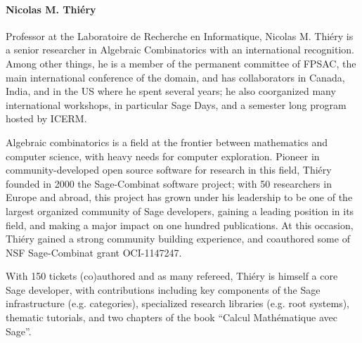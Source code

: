\paragraph{Nicolas M. Thiéry}

Professor at the Laboratoire de Recherche en Informatique, Nicolas
M. Thiéry is a senior researcher in Algebraic Combinatorics with an
international recognition. Among other things, he is a member of the
permanent committee of FPSAC, the main international conference of the
domain, and has collaborators in Canada, India, and in the US where he
spent several years; he also coorganized many international workshops,
in particular Sage Days, and a semester long program hosted by ICERM.

Algebraic combinatorics is a field at the frontier between mathematics
and computer science, with heavy needs for computer
exploration. Pioneer in community-developed open source software for
research in this field, Thiéry founded in 2000 the Sage-Combinat
software project; with 50 researchers in Europe and abroad, this
project has grown under his leadership to be one of the largest
organized community of Sage developers, gaining a leading position in
its field, and making a major impact on one hundred publications. At
this occasion, Thiéry gained a strong community building experience,
and coauthored some of NSF Sage-Combinat grant OCI-1147247.

With 150 tickets (co)authored and as many refereed, Thiéry is himself
a core Sage developer, with contributions including key components of
the Sage infrastructure (e.g. categories), specialized research
libraries (e.g. root systems), thematic tutorials, and two chapters of
the book ``Calcul Mathématique avec Sage''.

